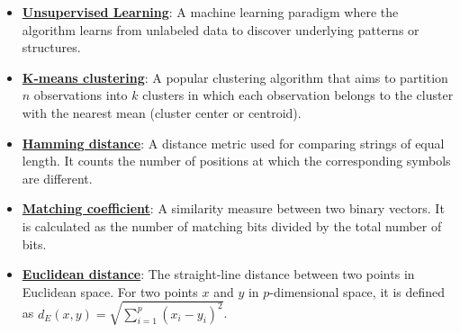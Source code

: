 \documentclass{article}%
\begin{document}
\begin{itemize}[leftmargin=*]
\item \href{https://purdue.brightspace.com/d2l/common/assets/pdfjs-d2l-dist/1.0.14-legacy/web/viewer.html?file=%2Fcontent%2Fenforced%2F1095467-wl.202510.CS.24300.001%2F12L2-distance-clusters.pdf%3Fou%3D1095467&lang=en-us&container=d2l-fileviewer-rendered-pdf&fullscreen=d2l-fileviewer-rendered-pdf-dialog&height=667#page=3}{\textbf{Unsupervised Learning}}: A machine learning paradigm where the algorithm learns from unlabeled data to discover underlying patterns or structures.%
\item \href{https://purdue.brightspace.com/d2l/common/assets/pdfjs-d2l-dist/1.0.14-legacy/web/viewer.html?file=%2Fcontent%2Fenforced%2F1095467-wl.202510.CS.24300.001%2F12L2-distance-clusters.pdf%3Fou%3D1095467&lang=en-us&container=d2l-fileviewer-rendered-pdf&fullscreen=d2l-fileviewer-rendered-pdf-dialog&height=667#page=21}{\textbf{K-means clustering}}: A popular clustering algorithm that aims to partition $n$ observations into $k$ clusters in which each observation belongs to the cluster with the nearest mean (cluster center or centroid).%
\item \href{https://purdue.brightspace.com/d2l/common/assets/pdfjs-d2l-dist/1.0.14-legacy/web/viewer.html?file=%2Fcontent%2Fenforced%2F1095467-wl.202510.CS.24300.001%2F12L2-distance-clusters.pdf%3Fou%3D1095467&lang=en-us&container=d2l-fileviewer-rendered-pdf&fullscreen=d2l-fileviewer-rendered-pdf-dialog&height=667#page=19}{\textbf{Hamming distance}}: A distance metric used for comparing strings of equal length. It counts the number of positions at which the corresponding symbols are different.%
\item \href{https://purdue.brightspace.com/d2l/common/assets/pdfjs-d2l-dist/1.0.14-legacy/web/viewer.html?file=%2Fcontent%2Fenforced%2F1095467-wl.202510.CS.24300.001%2F12L2-distance-clusters.pdf%3Fou%3D1095467&lang=en-us&container=d2l-fileviewer-rendered-pdf&fullscreen=d2l-fileviewer-rendered-pdf-dialog&height=667#page=19}{\textbf{Matching coefficient}}: A similarity measure between two binary vectors. It is calculated as the number of matching bits divided by the total number of bits.%
\item \href{https://purdue.brightspace.com/d2l/common/assets/pdfjs-d2l-dist/1.0.14-legacy/web/viewer.html?file=%2Fcontent%2Fenforced%2F1095467-wl.202510.CS.24300.001%2F12L2-distance-clusters.pdf%3Fou%3D1095467&lang=en-us&container=d2l-fileviewer-rendered-pdf&fullscreen=d2l-fileviewer-rendered-pdf-dialog&height=667#page=17}{\textbf{Euclidean distance}}: The straight-line distance between two points in Euclidean space. For two points $x$ and $y$ in $p$-dimensional space, it is defined as $d_E(x, y) = \sqrt{\sum_{i=1}^p (x_i - y_i)^2}$.%

\end{itemize}
\end{document}

